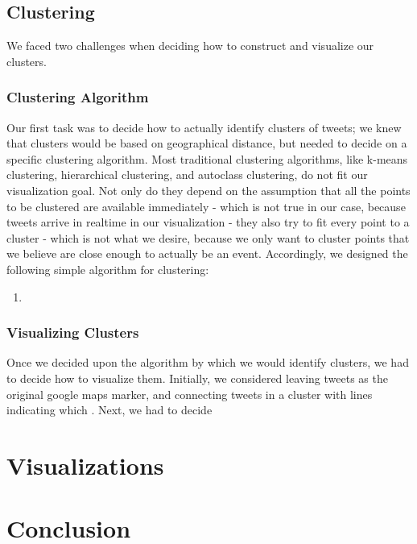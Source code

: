 \documentclass[pdftex,12pt,a4paper]{article}
\begin{document}
\subsection{Clustering}
We faced two challenges when deciding how to construct and visualize our clusters.

\subsubsection{Clustering Algorithm}
Our first task was to decide how to actually identify clusters of tweets; we knew that clusters would be based on geographical distance, but needed to decide on a specific clustering algorithm. Most traditional clustering algorithms, like k-means clustering, hierarchical clustering, and autoclass clustering, do not fit our visualization goal. Not only do they depend on the assumption that all the points to be clustered are available immediately - which is not true in our case, because tweets arrive in realtime in our visualization - they also try to fit every point to a cluster - which is not what we desire, because we only want to cluster points that we believe are close enough to actually be an event. Accordingly, we designed the following simple algorithm for clustering:
\begin{enumerate}
\item
\end{enumerate}

\subsubsection{Visualizing Clusters}
Once we decided upon the algorithm by which we would identify clusters, we had to decide how to visualize them. Initially, we considered leaving tweets as the original google maps marker, and connecting tweets in a cluster with lines indicating which . Next, we had to decide

\section{Visualizations} 

\section{Conclusion}
\end{document}
